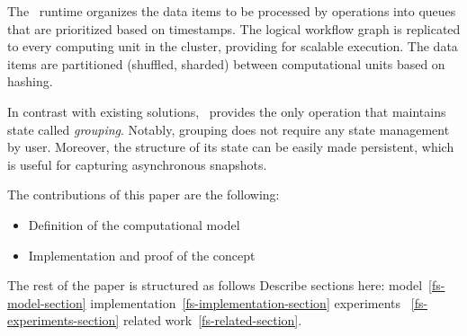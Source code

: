 The \FlameStream ~runtime organizes the data items to be processed by operations into queues that are prioritized based on timestamps. The logical workflow graph is replicated to every computing unit in the cluster, providing for scalable execution. The data items are partitioned (shuffled, sharded) between computational units based on hashing.

In contrast with existing solutions, \FlameStream ~provides the only operation that maintains state called {\it grouping}. Notably, grouping does not require any state management by user. Moreover, the structure of its state can be easily made persistent, which is useful for capturing asynchronous snapshots.

The contributions of this paper are the following:

\begin {itemize}
\item Definition of the computational model
\item Implementation and proof of the concept
\end {itemize}

The rest of the paper is structured as follows 
Describe sections here: model~\ref {fs-model-section}
implementation~\ref{fs-implementation-section}
experiments ~\ref{fs-experiments-section}
related work~\ref{fs-related-section}.


\endinput
